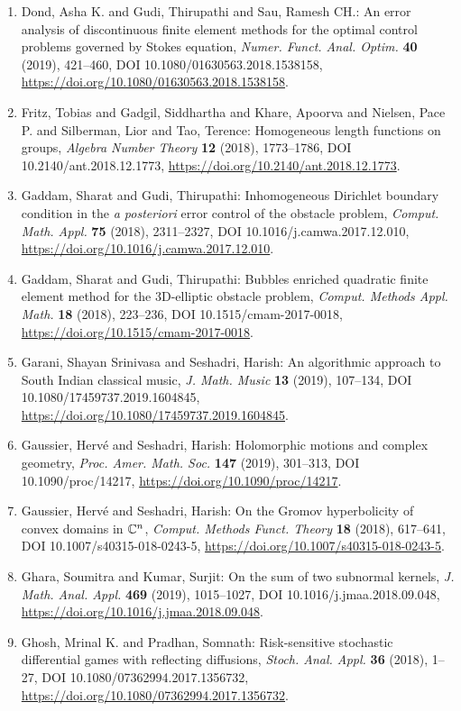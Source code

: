 \begin{enumerate}
\item Dond, Asha K. and Gudi, Thirupathi and Sau, Ramesh CH.: An error analysis of discontinuous finite element methods for
the optimal control problems governed by {S}tokes equation, \emph{Numer. Funct. Anal. Optim.} {\bf 40} (2019), 421--460, DOI 10.1080/01630563.2018.1538158, \url{https://doi.org/10.1080/01630563.2018.1538158}.
\item Fritz, Tobias and Gadgil, Siddhartha and Khare, Apoorva and Nielsen, Pace P. and Silberman, Lior and Tao, Terence: Homogeneous length functions on groups, \emph{Algebra Number Theory} {\bf 12} (2018), 1773--1786, DOI 10.2140/ant.2018.12.1773, \url{https://doi.org/10.2140/ant.2018.12.1773}.
\item Gaddam, Sharat and Gudi, Thirupathi: Inhomogeneous {D}irichlet boundary condition in the {\it a
posteriori} error control of the obstacle problem, \emph{Comput. Math. Appl.} {\bf 75} (2018), 2311--2327, DOI 10.1016/j.camwa.2017.12.010, \url{https://doi.org/10.1016/j.camwa.2017.12.010}.
\item Gaddam, Sharat and Gudi, Thirupathi: Bubbles enriched quadratic finite element method for the
3{D}-elliptic obstacle problem, \emph{Comput. Methods Appl. Math.} {\bf 18} (2018), 223--236, DOI 10.1515/cmam-2017-0018, \url{https://doi.org/10.1515/cmam-2017-0018}.
\item Garani, Shayan Srinivasa and Seshadri, Harish: An algorithmic approach to {S}outh {I}ndian classical music, \emph{J. Math. Music} {\bf 13} (2019), 107--134, DOI 10.1080/17459737.2019.1604845, \url{https://doi.org/10.1080/17459737.2019.1604845}.
\item Gaussier, Herv\'{e} and Seshadri, Harish: Holomorphic motions and complex geometry, \emph{Proc. Amer. Math. Soc.} {\bf 147} (2019), 301--313, DOI 10.1090/proc/14217, \url{https://doi.org/10.1090/proc/14217}.
\item Gaussier, Herv\'{e} and Seshadri, Harish: On the {G}romov hyperbolicity of convex domains in {$\Bbb
C^n$}, \emph{Comput. Methods Funct. Theory} {\bf 18} (2018), 617--641, DOI 10.1007/s40315-018-0243-5, \url{https://doi.org/10.1007/s40315-018-0243-5}.
\item Ghara, Soumitra and Kumar, Surjit: On the sum of two subnormal kernels, \emph{J. Math. Anal. Appl.} {\bf 469} (2019), 1015--1027, DOI 10.1016/j.jmaa.2018.09.048, \url{https://doi.org/10.1016/j.jmaa.2018.09.048}.
\item Ghosh, Mrinal K. and Pradhan, Somnath: Risk-sensitive stochastic differential games with reflecting
diffusions, \emph{Stoch. Anal. Appl.} {\bf 36} (2018), 1--27, DOI 10.1080/07362994.2017.1356732, \url{https://doi.org/10.1080/07362994.2017.1356732}.

\end{enumerate}
